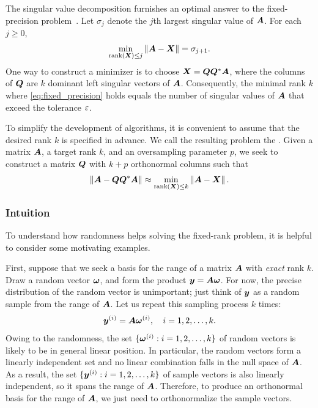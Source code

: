 \documentclass{article}
\begin{document}
The singular value decomposition furnishes an optimal answer to
the fixed-precision problem~\cite{Mir60:Symmetric-Gauge}.
Let $\sigma_{j}$ denote the $j$th largest singular value of $\bm{A}$.
For each $j \geq 0$,
\begin{equation}
\label{eqn:mirsky}
\min_{{\rm rank}(\bm{X}) \leq j}\left\Vert { \bm{A} - \bm{X} } \right\Vert = \sigma_{j+1}.
\end{equation}
One way to construct a minimizer is to choose $\bm{X} = \bm{QQ}^*\bm{A}$,
where the columns of $\bm{Q}$ are $k$ dominant left singular vectors of $\bm{A}$.
Consequently, the minimal rank $k$ where \eqref{eq:fixed_precision} holds
equals the number of singular values of $\bm{A}$ that exceed the tolerance $\varepsilon$.

To simplify the development of algorithms, it is convenient to assume
that the desired rank $k$ is specified in advance.
We call the resulting problem the .  Given a matrix $\bm{A}$, a target rank $k$,
and an oversampling parameter $p$, we seek to construct a matrix
$\bm{Q}$ with $k + p$ orthonormal columns such that
\begin{equation}
\label{eq:fixed_rank}
\left\Vert { \bm{A} - \bm{Q}\bm{Q}^{*}\bm{A} } \right\Vert \approx
\min_{{\rm rank}(\bm{X}) \leq k}\left\Vert { \bm{A} - \bm{X} } \right\Vert.
\end{equation}

\subsubsection{Intuition}
\label{sec:intuition}

To understand how randomness helps solving the fixed-rank
problem, it is helpful to consider some motivating examples.

First, suppose that we seek a basis for the range of a matrix $\bm{A}$ with
\textit{exact} rank $k$. Draw a random vector $\bm{\omega}$,
and form the product $\bm{y} = \bm{A} \bm{\omega}$.
For now, the precise distribution of the random vector is
unimportant; just think of $\bm{y}$ as a random sample from the
range of $\bm{A}$. Let us repeat this sampling process $k$ times:
\begin{equation}
\label{eq:samples}
\bm{y}^{(i)} = \bm{A} \bm{\omega}^{(i)},
\quad
i = 1, 2, \dots, k.
\end{equation}
Owing to the randomness, the set $\{ \bm{\omega}^{(i)} : i = 1, 2, \dots, k \}$ of
random vectors is likely to be in general linear position.
In particular, the random vectors form a linearly independent set and
no linear combination falls in the null space of $\bm{A}$.  As a
result, the set $\{ \bm{y}^{(i)} : i = 1, 2, \dots, k \}$ of sample vectors is
also linearly independent, so it spans the range of $\bm{A}$.
Therefore, to produce an orthonormal basis for the range of
$\bm{A}$, we just need to orthonormalize the sample vectors.
\end{document}
